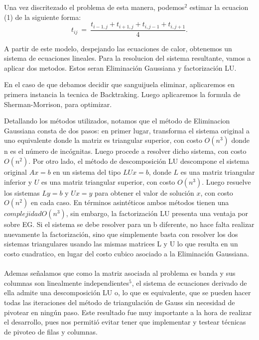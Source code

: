 Una vez discritezado el problema de esta manera, podemos$^2$ estimar la ecuacion (1) de la siguiente forma:
\begin{equation}
t_{ij} \ =\ \frac{ t_{i-1,j} + t_{i+1,j} + t_{i,j-1} + t_{i,j+1}}{4}.\label{eq:calordd}
\end{equation}



A partir de este modelo, despejando las ecuaciones de calor, obtenemos un sistema de ecuaciones lineales.
Para la resolucion del sistema resultante, vamos a aplicar dos metodos. Estos seran Eliminaci\'on Gaussiana y factorizaci\'on LU.

En el caso de que debamos decidir que sanguijuela eliminar, aplicaremos en primera instancia la tecnica de Backtraking. Luego aplicaremos
la formula de Sherman-Morrison, para optimizar. 

Detallando los m\'etodos utilizados, notamos que el m\'etodo de Eliminacion Gaussiana consta de dos pasos: en primer
lugar, transforma el sistema original a uno equivalente donde la matriz es triangular
superior, con costo $O(n^3)$ donde n es el n\'umero de inc\'ognitas. Luego procede a resolver dicho
sistema, con costo $O(n^2)$. Por otro lado, el m\'etodo de descomposici\'on LU descompone el sistema original
$Ax = b$ en un sistema del tipo $LUx = b$, donde $L$ es una matriz triangular inferior y $U$ es una matriz
triangular superior, con costo $O(n^3)$. Luego resuelve los sistemas $Ly = b$ y
$Ux = y$ para obtener el valor de soluci\'on $x$, con costo $O(n^2)$ en cada caso. 
En t\'erminos asint\'eticos ambos m\'etodos tienen una $complejidad O(n^3)$, sin embargo, la factorizaci\'on LU presenta 
una ventaja por sobre EG. Si el sistema se debe resolver para un b diferente, no hace falta realizar nuevamente la factorizaci\'on,
sino que simplemente basta con resolver los dos sistemas triangulares usando las mismas matrices L y
U lo que resulta en un costo cuadratico, en lugar del costo cubico asociado a la Eliminaci\'on Gaussiana. \\\\


Ademas se\~nalamos que como la matriz asociada al problema es
banda y sus columnas son linealmente independientes$^5$,
el sistema de ecuaciones
derivado de ella admite una descomposici\'on LU o, lo que es equivalente, que se pueden hacer todas
las iteraciones del m\'etodo de triangulaci\'on de Gauss sin necesidad de pivotear en ning\'un paso. 
Este resultado fue muy importante a la hora de realizar
el desarrollo, pues nos permiti\'o evitar tener que implementar y testear t\'ecnicas de pivoteo de filas y
columnas.
